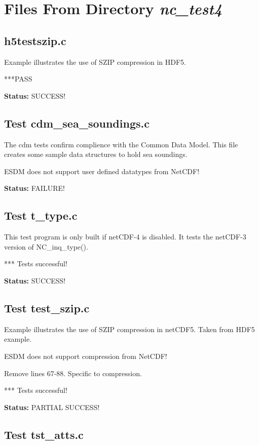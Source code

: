 \chapter{Files From Directory {\textit{nc\_test4}}}

\section{h5testszip.c}

Example illustrates the use of SZIP compression in HDF5.

***PASS

{\bf \large Status: } SUCCESS!

\section{Test cdm\_sea\_soundings.c}

The cdm tests confirm complience with the Common Data Model. This
file creates some sample data structures to hold sea soundings.

ESDM does not support user defined datatypes from NetCDF!

{\bf \large Status: } FAILURE!

\section{Test t\_type.c}

This test program is only built if netCDF-4 is disabled. It tests
   the netCDF-3 version of NC\_inq\_type().

*** Tests successful!

{\bf \large Status: } SUCCESS!

\section{Test test\_szip.c}

Example illustrates the use of SZIP compression in netCDF5.
Taken from HDF5 example.

ESDM does not support compression from NetCDF!

Remove lines 67-88. Specific to compression.

*** Tests successful!

{\bf \large Status: } PARTIAL SUCCESS!

\section{Test tst\_atts.c}

